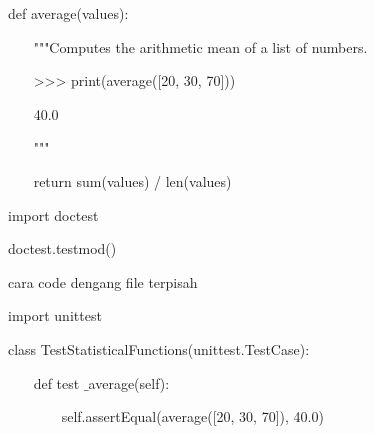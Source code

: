 \documentclass[a4paper,12pt]{report}
\begin{document}
\vspace{12pt}
\noindent 
{\fontsize{14pt}{14pt}\selectfont def average(values): \\} \par
\noindent 
{\fontsize{14pt}{14pt}\selectfont ~~~ """Computes the arithmetic mean of a list of numbers. \\} \par
\vspace{14pt}
\noindent 
{\fontsize{14pt}{14pt}\selectfont ~~~ >>> print(average([20, 30, 70])) \\} \par
\noindent 
{\fontsize{14pt}{14pt}\selectfont ~~~ 40.0 \\} \par
\noindent 
{\fontsize{14pt}{14pt}\selectfont ~~~ """ \\} \par
\noindent 
{\fontsize{14pt}{14pt}\selectfont ~~~ return sum(values) / len(values) \\} \par
\vspace{14pt}
\noindent 
{\fontsize{14pt}{14pt}\selectfont import doctest \\} \par
\noindent 
{\fontsize{14pt}{14pt}\selectfont doctest.testmod()~~  \\} \par
\vspace{14pt}
\noindent 
{\fontsize{14pt}{14pt}\selectfont cara code dengang file terpisah \\} \par
\vspace{14pt}
\noindent 
{\fontsize{14pt}{14pt}\selectfont import unittest \\} \par
\vspace{14pt}
\noindent 
{\fontsize{14pt}{14pt}\selectfont class TestStatisticalFunctions(unittest.TestCase): \\} \par
\vspace{14pt}
\noindent 
{\fontsize{14pt}{14pt}\selectfont ~~~ def test $  \_  $average(self): \\} \par
\vspace{14pt}
\noindent 
{\fontsize{14pt}{14pt}\selectfont ~~~~~~~ self.assertEqual(average([20, 30, 70]), 40.0) \\} \par
\vspace{14pt}
\end{document}
